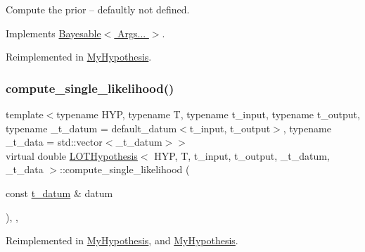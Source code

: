 Compute the prior -- defaultly not defined. 



Implements \hyperlink{class_bayesable_a9aa752f0adff1b95f8957b91fc928649}{Bayesable$<$ Args... $>$}.



Reimplemented in \hyperlink{class_my_hypothesis_ab092094c5fc31730de4f40609220bb18}{My\+Hypothesis}.

\mbox{\label{class_l_o_t_hypothesis_a835f1aafdd4bc4748c343edb80517956}} 
\subsubsection{\texorpdfstring{compute\+\_\+single\+\_\+likelihood()}{compute\_single\_likelihood()}}
{\footnotesize\ttfamily template$<$typename H\+YP, typename T, typename t\+\_\+input, typename t\+\_\+output, typename \+\_\+t\+\_\+datum = default\+\_\+datum$<$t\+\_\+input, t\+\_\+output$>$, typename \+\_\+t\+\_\+data = std\+::vector$<$\+\_\+t\+\_\+datum$>$$>$ \\
virtual double \hyperlink{class_l_o_t_hypothesis}{L\+O\+T\+Hypothesis}$<$ H\+YP, T, t\+\_\+input, t\+\_\+output, \+\_\+t\+\_\+datum, \+\_\+t\+\_\+data $>$\+::compute\+\_\+single\+\_\+likelihood (\begin{DoxyParamCaption}\item[{const \hyperlink{class_l_o_t_hypothesis_a26d0ecfa6a367f32276d36cd01c0cead}{t\+\_\+datum} \&}]{datum }\end{DoxyParamCaption})\hspace{0.3cm}{\ttfamily [inline]}, {\ttfamily [override]}, {\ttfamily [virtual]}}



Reimplemented in \hyperlink{class_my_hypothesis_af60601a7db23e9ed8d1e3343af506733}{My\+Hypothesis}, and \hyperlink{class_my_hypothesis_a5e6bd5e0ebcb987aa4f0adf4295dba11}{My\+Hypothesis}.

\mbox{\label{class_l_o_t_hypothesis_af0274e15c0e19e8f42324b7099e2b4a1}} 
